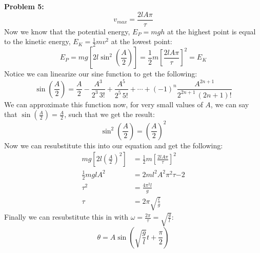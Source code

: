 \documentclass[11pt]{article}
\newenvironment{problem}[1]{\textbf{Problem #1: }}{\newpage}
\begin{document}
\begin{problem}{5}
		\[v_{max} = \frac{2lA\pi}{\tau}\]
		Now we know that the potential energy, $E_P = mgh$ at the highest point is equal to the kinetic energy, $E_K = \frac{1}{2}mv^2$ at the lowest point:
		\[E_P = mg\left[2l\sin^2\left(\frac{A}{2}\right)\right] = \frac{1}{2}m\left[\frac{2lA\pi}{\tau}\right]^2 = E_K\]
		Notice we can linearize our sine function to get the following:
		\[\sin\left(\frac{A}{2}\right) = \frac{A}{2} - \frac{A^3}{2^3\,3!} + \frac{A^5}{2^5\,5!} + \cdots + (-1)^n \frac{A^{2n+1}}{2^{2n+1}\,(2n+1)!} \] 
		We can approximate this function now, for very small values of $A$, we can say that $\sin\left(\frac{A}{2}\right) = \frac{A}{2}$, such that we get the result:
		\[\sin^2\left(\frac{A}{2}\right) = \left(\frac{A}{2}\right)^2\]
		Now we can resubstitute this into our equation and get the following:
		\begin{align*}
			 mg\left[2l\left(\frac{A}{2}\right)^2\right] &= \frac{1}{2}m\left[\frac{2lA\pi}{\tau}\right]^2 \\
			 \frac{1}{2}mglA^2 &= 2ml^2A^2\pi^2\tau{-2} \\
			 \tau^2 &= \frac{4\pi^2 l}{g} \\
			 \tau &= 2\pi \sqrt{\frac{l}{g}}
		\end{align*}
		Finally we can resubstitute this in with $\omega = \frac{2\pi}{\tau} = \sqrt{\frac{g}{l}}$:
		\[\theta = A\sin\left(\sqrt{\frac{g}{l}} t + \frac{\pi}{2}\right)\]
	\end{problem}
		
\end{document}
